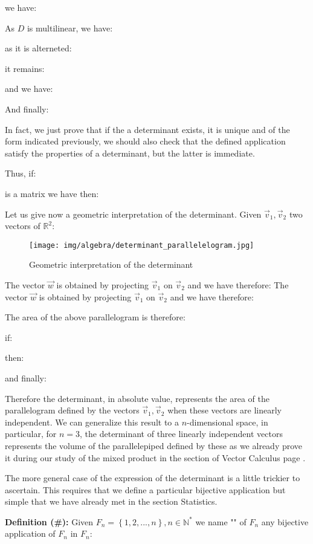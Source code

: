 	we have:
	
	As $D$ is multilinear, we have:
	
	as it is alterneted:
	
	it remains:
	
	and we have:
	
	And finally:
	
	In fact, we just prove that if the a determinant exists, it is unique and of the form indicated previously, we should also check that the defined application satisfy the properties of a determinant, but the latter is immediate.
	
	Thus, if:
	
	is a matrix we have then:
	
	Let us give now a geometric interpretation of the determinant. Given $\vec{v}_1,\vec{v}_2$ two vectors of $\mathbb{R}^2$:
	\begin{figure}[H]
		\centering
		\texttt{[image: img/algebra/determinant\_parallelelogram.jpg]}
		\caption{Geometric interpretation of the determinant}
	\end{figure}
	The vector $\vec{w}$ is obtained by projecting $\vec{v}_1$ on $\vec{v}_2$ and we have therefore:
	The vector $\vec{w}$ is obtained by projecting $\vec{v}_1$ on $\vec{v}_2$ and we have therefore:
	
	The area of the above parallelogram is therefore:
		
	if:
	
	then:
	
	and finally:
	
	Therefore the determinant, in absolute value, represents the area of the parallelogram defined by the vectors $\vec{v}_1,\vec{v}_2$ when these vectors are linearly independent. We can generalize this result to a $n$-dimensional space, in particular, for $n=3$, the determinant of three linearly independent vectors represents the volume of the parallelepiped defined by these as we already prove it during our study of the mixed product in the section of Vector Calculus page \pageref{mixed product}.
	
	The more general case of the expression of the determinant is a little trickier to ascertain. This requires that we define a particular bijective application but simple that we have already met in the section Statistics.
	
	\textbf{Definition (\#\mydef):} Given $F_n=\left\lbrace 1,2,...,n\right\rbrace,n\in \mathbb{N}^{*}$ we name "" of $F_n$ any bijective application of $F_n$ in $F_n$:
	
